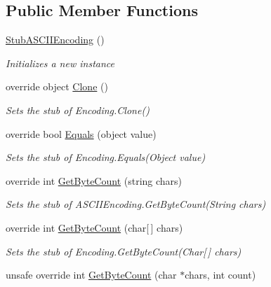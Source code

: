 \subsection*{Public Member Functions}
\begin{DoxyCompactItemize}
\item 
\hyperlink{class_system_1_1_text_1_1_fakes_1_1_stub_a_s_c_i_i_encoding_ae0472eb4c7c63eaccf9dd4d722d74926}{Stub\-A\-S\-C\-I\-I\-Encoding} ()
\begin{DoxyCompactList}\small\item\em Initializes a new instance\end{DoxyCompactList}\item 
override object \hyperlink{class_system_1_1_text_1_1_fakes_1_1_stub_a_s_c_i_i_encoding_ae42a2d4db07bc078079fbc5ec5c2dfe4}{Clone} ()
\begin{DoxyCompactList}\small\item\em Sets the stub of Encoding.\-Clone()\end{DoxyCompactList}\item 
override bool \hyperlink{class_system_1_1_text_1_1_fakes_1_1_stub_a_s_c_i_i_encoding_ab1a6fdd6ed33b76108edb48817459a84}{Equals} (object value)
\begin{DoxyCompactList}\small\item\em Sets the stub of Encoding.\-Equals(\-Object value)\end{DoxyCompactList}\item 
override int \hyperlink{class_system_1_1_text_1_1_fakes_1_1_stub_a_s_c_i_i_encoding_a8a3bc9867e3f7818c6e932dac96f6e54}{Get\-Byte\-Count} (string chars)
\begin{DoxyCompactList}\small\item\em Sets the stub of A\-S\-C\-I\-I\-Encoding.\-Get\-Byte\-Count(\-String chars)\end{DoxyCompactList}\item 
override int \hyperlink{class_system_1_1_text_1_1_fakes_1_1_stub_a_s_c_i_i_encoding_ac4bacf44893feb10c039e0373efde9bb}{Get\-Byte\-Count} (char\mbox{[}$\,$\mbox{]} chars)
\begin{DoxyCompactList}\small\item\em Sets the stub of Encoding.\-Get\-Byte\-Count(\-Char\mbox{[}$\,$\mbox{]} chars)\end{DoxyCompactList}\item 
unsafe override int \hyperlink{class_system_1_1_text_1_1_fakes_1_1_stub_a_s_c_i_i_encoding_af6d0a37f653422bf43ae6819f0da4a04}{Get\-Byte\-Count} (char $\ast$chars, int count)

\end{DoxyCompactItemize}

